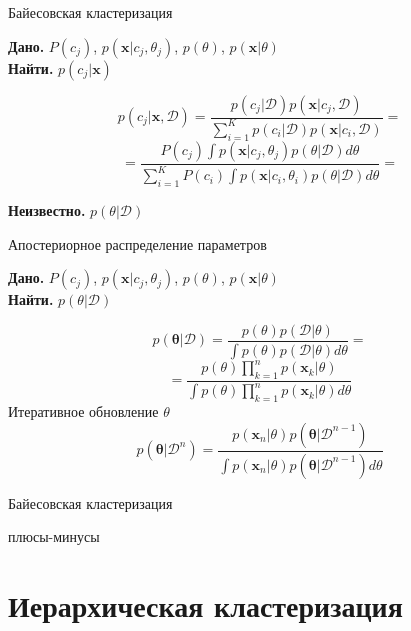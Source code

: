 \documentclass[10pt]{beamer}
\begin{document}
\begin{frame}{Байесовская кластеризация}

{\bf Дано.} \underline{$P(c_j)$}, \underline{$p(\mathbf{x} | c_j, \theta_j)$}, $p(\theta)$, $p(\mathbf{x} | \theta)$ \\
{\bf Найти.} $p(c_j | \mathbf{x})$

\[
p(c_j | \mathbf{x}, \mathcal{D}) = \frac{p(c_j | \mathcal{D}) p(\mathbf{x} | c_j, \mathcal{D})}{\sum_{i=1}^K p(c_i | \mathcal{D}) p(\mathbf{x} | c_i, \mathcal{D})} =
\]
\[
= \frac{P(c_j) \int p(\mathbf{x} | c_j, \theta_j) p(\theta | \mathcal{D}) d \theta}{\sum_{i=1}^K P(c_i) \int p(\mathbf{x} | c_i, \theta_i) p(\theta | \mathcal{D}) d \theta} =
\]

{\bf Неизвестно.} $p(\theta | \mathcal{D})$

\end{frame}

\begin{frame}{Апостериорное распределение параметров}

{\bf Дано.} \underline{$P(c_j)$}, \underline{$p(\mathbf{x} | c_j, \theta_j)$}, \underline{$p(\theta)$}, \underline{$p(\mathbf{x} | \theta)$} \\
{\bf Найти.} $p(\theta | \mathcal{D})$

\[
p(\mathbf{\theta} | \mathcal{D}) = \frac{p(\theta) p(\mathcal{D} | \theta)}{\int p(\theta) p(\mathcal{D} | \theta) d \theta} =
\]
\[
= \frac{p(\theta) \prod_{k=1}^n p(\mathbf{x}_k | \theta)}{\int p(\theta) \prod_{k=1}^n p(\mathbf{x}_k | \theta) d \theta}
\]
Итеративное обновление $\theta$
\[
p(\mathbf{\theta} | \mathcal{D}^n) = \frac{p(\mathbf{x}_n | \theta) p(\mathbf{\theta} | \mathcal{D}^{n-1})}{\int p(\mathbf{x}_n | \theta) p(\mathbf{\theta} | \mathcal{D}^{n-1}) d \theta}
\]

\end{frame}

\begin{frame}{Байесовская кластеризация}

плюсы-минусы

\end{frame}


\section{Иерархическая кластеризация}

\end{document}
